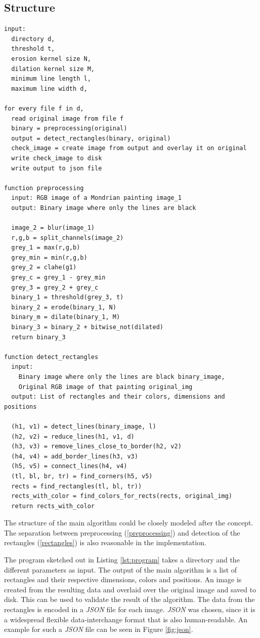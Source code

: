 \documentclass[serif,article,noparskip]{agse-thesis}
\begin{document}
\subsection{Structure} \label{structure}

\begin{lstlisting}[otherkeywords={function,input\:,output\:},label=lst:program,caption=Flow and structure of the program]
input:
  directory d,
  threshold t,
  erosion kernel size N,
  dilation kernel size M,
  minimum line length l,
  maximum line width d,

for every file f in d,
  read original image from file f
  binary = preprocessing(original)
  output = detect_rectangles(binary, original)
  check_image = create image from output and overlay it on original
  write check_image to disk
  write output to json file

function preprocessing
  input: RGB image of a Mondrian painting image_1
  output: Binary image where only the lines are black

  image_2 = blur(image_1)
  r,g,b = split_channels(image_2)
  grey_1 = max(r,g,b)
  grey_min = min(r,g,b)
  grey_2 = clahe(g1)
  grey_c = grey_1 - grey_min
  grey_3 = grey_2 + grey_c
  binary_1 = threshold(grey_3, t)
  binary_2 = erode(binary_1, N)
  binary_m = dilate(binary_1, M)
  binary_3 = binary_2 + bitwise_not(dilated)
  return binary_3

function detect_rectangles
  input:
    Binary image where only the lines are black binary_image,
    Original RGB image of that painting original_img
  output: List of rectangles and their colors, dimensions and positions

  (h1, v1) = detect_lines(binary_image, l)
  (h2, v2) = reduce_lines(h1, v1, d)
  (h3, v3) = remove_lines_close_to_border(h2, v2)
  (h4, v4) = add_border_lines(h3, v3)
  (h5, v5) = connect_lines(h4, v4)
  (tl, bl, br, tr) = find_corners(h5, v5)
  rects = find_rectangles(tl, bl, tr))
  rects_with_color = find_colors_for_rects(rects, original_img)
  return rects_with_color
\end{lstlisting}

The structure of the main algorithm could be closely modeled after the concept.
The separation between preprocessing (\ref{preprocessing}) and detection of the
rectangles (\ref{rectangles}) is also reasonable in the implementation.

The program sketched out in Listing \ref{lst:program} takes a directory and the
different parameters as input. The output of the main algorithm is a list of
rectangles and their respective dimensions, colors and positions. An image is
created from the resulting data and overlaid over the original image and saved
to disk. This can be used to validate the result of the algorithm. The data from
the rectangles is encoded in a \textit{JSON} file for each image. \textit{JSON}
was chosen, since it is a widespread flexible data-interchange format that is
also human-readable. An example for such a \textit{JSON} file can be seen in
Figure \ref{fig:json}.
\end{document}
